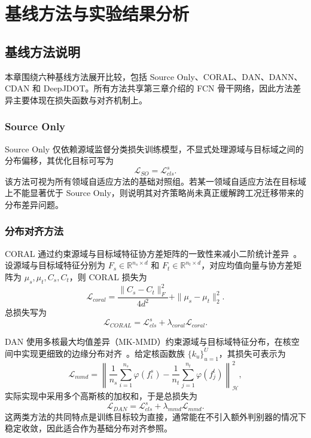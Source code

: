 \chapter{基线方法与实验结果分析}

\section{基线方法说明}
本章围绕六种基线方法展开比较，包括 Source Only、CORAL、DAN、DANN、CDAN 和 DeepJDOT。所有方法共享第三章介绍的 FCN 骨干网络，因此方法差异主要体现在损失函数与对齐机制上。

\subsection{Source Only}
Source Only 仅依赖源域监督分类损失训练模型，不显式处理源域与目标域之间的分布偏移，其优化目标可写为
\begin{equation}
\mathcal{L}_{SO}=\mathcal{L}_{cls}^s.
\end{equation}
该方法可视为所有领域自适应方法的基础对照组。若某一领域自适应方法在目标域上不能显著优于 Source Only，则说明其对齐策略尚未真正缓解跨工况迁移带来的分布差异问题。

\subsection{分布对齐方法}
CORAL 通过约束源域与目标域特征协方差矩阵的一致性来减小二阶统计差异~\cite{sun2016deep}。设源域与目标域特征分别为 $F_s\in\mathbb{R}^{n_s\times d}$ 和 $F_t\in\mathbb{R}^{n_t\times d}$，对应均值向量与协方差矩阵为 $\mu_s,\mu_t,C_s,C_t$，则 CORAL 损失为
\begin{equation}
\mathcal{L}_{coral}=
\frac{\|C_s-C_t\|_F^2}{4d^2}
+\|\mu_s-\mu_t\|_2^2.
\end{equation}
总损失写为
\begin{equation}
\mathcal{L}_{CORAL}=\mathcal{L}_{cls}^s+\lambda_{coral}\mathcal{L}_{coral}.
\end{equation}

DAN 使用多核最大均值差异（MK-MMD）约束源域与目标域特征分布，在核空间中实现更细致的边缘分布对齐~\cite{long2015dan}。给定核函数族 $\{k_u\}_{u=1}^{U}$，其损失可表示为
\begin{equation}
\mathcal{L}_{mmd}=
\left\|
\frac{1}{n_s}\sum_{i=1}^{n_s}\varphi(f_i^s)-
\frac{1}{n_t}\sum_{j=1}^{n_t}\varphi(f_j^t)
\right\|_{\mathcal{H}}^2,
\end{equation}
实际实现中采用多个高斯核的加权和，于是总损失为
\begin{equation}
\mathcal{L}_{DAN}=\mathcal{L}_{cls}^s+\lambda_{mmd}\mathcal{L}_{mmd}.
\end{equation}
这两类方法的共同特点是训练目标较为直接，通常能在不引入额外判别器的情况下稳定收敛，因此适合作为基础分布对齐参照。

